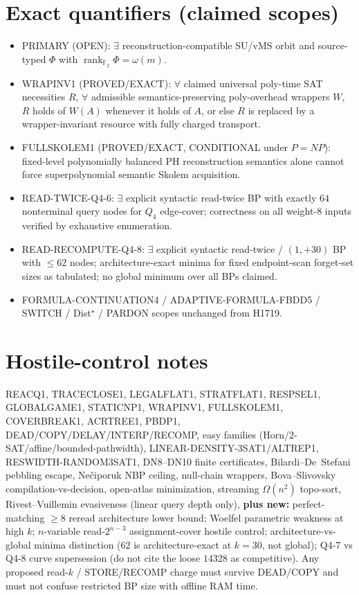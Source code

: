 \documentclass[11pt]{article}
\begin{document}
\section*{Exact quantifiers (claimed scopes)}
\begin{itemize}
\item PRIMARY (OPEN): $\exists$ reconstruction-compatible SU/vMS orbit and source-typed
  $\Phi$ with $\operatorname{rank}_{\mathbb F_2}\Phi=\omega(m)$.
\item WRAPINV1 (PROVED/EXACT): $\forall$ claimed universal poly-time SAT necessities $R$,
  $\forall$ admissible semantics-preserving poly-overhead wrappers $W$, $R$ holds of $W(A)$
  whenever it holds of $A$, or else $R$ is replaced by a wrapper-invariant resource with
  fully charged transport.
\item FULLSKOLEM1 (PROVED/EXACT, CONDITIONAL under $P=NP$): fixed-level polynomially
  balanced PH reconstruction semantics alone cannot force superpolynomial semantic Skolem
  acquisition.
\item READ-TWICE-Q4-6: $\exists$ explicit syntactic read-twice BP with exactly $64$ nonterminal
  query nodes for $Q_4$ edge-cover; correctness on all weight-$8$ inputs verified by
  exhaustive enumeration.
\item READ-RECOMPUTE-Q4-8: $\exists$ explicit syntactic read-twice / $(1,+30)$ BP with
  $\le62$ nodes; architecture-exact minima for fixed endpoint-scan forget-set sizes as tabulated;
  no global minimum over all BPs claimed.
\item FORMULA-CONTINUATION4 / ADAPTIVE-FORMULA-FBDD5 / SWITCH / Dist$^\star$ / PARDON scopes
  unchanged from H1719.
\end{itemize}

\section*{Hostile-control notes}
REACQ1, TRACECLOSE1, LEGALFLAT1, STRATFLAT1, RESPSEL1, GLOBALGAME1, STATICNP1, WRAPINV1,
FULLSKOLEM1, COVERBREAK1, ACRTREE1, PBDP1, DEAD/COPY/DELAY/INTERP/RECOMP, easy families
(Horn/2-SAT/affine/bounded-pathwidth), LINEAR-DENSITY-3SAT1/ALTREP1, RESWIDTH-RANDOM3SAT1,
DN8--DN10 finite certificates, Bilardi--De~Stefani pebbling escape, Ne\v{c}iporuk NBP ceiling,
null-chain wrappers, Bova--Slivovsky compilation-vs-decision, open-atlas minimization,
streaming $\Omega(n^2)$ topo-sort, Rivest--Vuillemin evasiveness (linear query depth only),
\textbf{plus new:} perfect-matching $\ge8$ reread architecture lower bound; Woelfel parametric
weakness at high $k$; $n$-variable read-$2^{n-3}$ assignment-cover hostile control;
architecture-vs-global minima distinction ($62$ is architecture-exact at $k=30$, not global);
Q4-7 vs Q4-8 curve supersession (do not cite the loose $14328$ as competitive).
Any proposed read-$k$ / STORE/RECOMP charge must survive DEAD/COPY and must not confuse
restricted BP size with offline RAM time.
\end{document}
